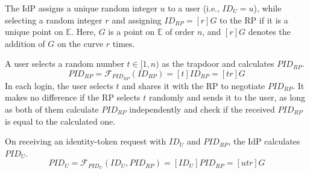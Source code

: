 The IdP assigns a unique random integer $u$ to a user (i.e., $ID_U = u$),
 while selecting a random integer $r$ and assigning $ID_{RP} = [r]G$ to the RP if it is a unique point on $\mathbb{E}$.
Here, $G$ is a point on $\mathbb{E}$ of order $n$, and $[r]G$ denotes the addition of $G$ on the curve $r$ times.




 A user selects a random number $t \in [1, n)$ as the trapdoor and calculates $PID_{RP}$.
\begin{equation}
PID_{RP} = \mathcal{F}_{PID_{RP}}(ID_{RP}) = [t]{ID_{RP}} = [tr]G
\label{equ:PIDRP}
\end{equation}
\newc
In each login, the user selects $t$ and shares it with the RP to negotiate $PID_{RP}$.
It makes no difference if the RP selects $t$ randomly and sends it to the user, as long as both of them calculate $PID_{RP}$ independently and check if the received $PID_{RP}$ is equal to the calculated one.

\oldc
{}
On receiving an identity-token request with $ID_U$ and $PID_{RP}$, the IdP calculates $PID_{U}$.
\begin{equation}
PID_{U} = \mathcal{F}_{PID_U}(ID_U, PID_{RP}) =
  [{ID_U}]{PID_{RP}} = [utr]G
 \label{equ:PIDU}
\end{equation}


